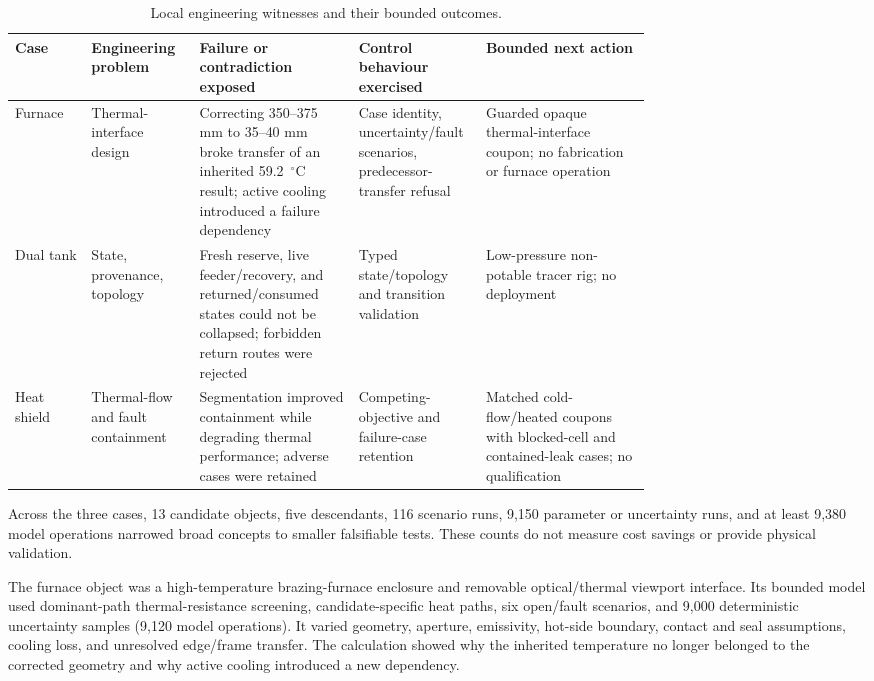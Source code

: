 \documentclass[10pt,a4paper]{article}
\begin{document}
\begin{table}[htbp]\centering\scriptsize
\caption{Local engineering witnesses and their bounded outcomes.}
\begin{tabularx}{\linewidth}{@{}p{0.12\linewidth}p{0.17\linewidth}p{0.25\linewidth}p{0.20\linewidth}X@{}}\toprule
Case & Engineering problem & Failure or contradiction exposed & Control behaviour exercised & Bounded next action\\\midrule
Furnace & Thermal-interface design & Correcting 350--375 mm to 35--40 mm broke transfer of an inherited 59.2~$^\circ$C result; active cooling introduced a failure dependency & Case identity, uncertainty/fault scenarios, predecessor-transfer refusal & Guarded opaque thermal-interface coupon; no fabrication or furnace operation\\
Dual tank & State, provenance, topology & Fresh reserve, live feeder/recovery, and returned/consumed states could not be collapsed; forbidden return routes were rejected & Typed state/topology and transition validation & Low-pressure non-potable tracer rig; no deployment\\
Heat shield & Thermal-flow and fault containment & Segmentation improved containment while degrading thermal performance; adverse cases were retained & Competing-objective and failure-case retention & Matched cold-flow/heated coupons with blocked-cell and contained-leak cases; no qualification\\
\bottomrule\end{tabularx}\end{table}

Across the three cases, 13 candidate objects, five descendants, 116 scenario runs, 9,150 parameter or uncertainty runs, and at least 9,380 model operations narrowed broad concepts to smaller falsifiable tests. These counts do not measure cost savings or provide physical validation.

The furnace object was a high-temperature brazing-furnace enclosure and removable optical/thermal viewport interface. Its bounded model used dominant-path thermal-resistance screening, candidate-specific heat paths, six open/fault scenarios, and 9,000 deterministic uncertainty samples (9,120 model operations). It varied geometry, aperture, emissivity, hot-side boundary, contact and seal assumptions, cooling loss, and unresolved edge/frame transfer. The calculation showed why the inherited temperature no longer belonged to the corrected geometry and why active cooling introduced a new dependency.
\end{document}
